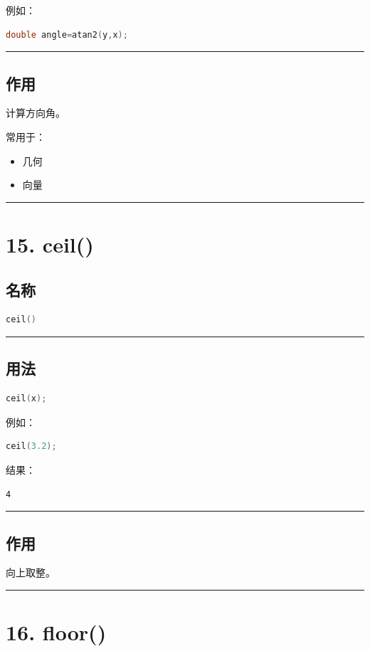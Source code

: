 \documentclass[9pt,twocolumn]{extarticle}
\begin{document}
例如：
\begin{lstlisting}[language=C++]
double angle=atan2(y,x);
\end{lstlisting}

\noindent\rule{\linewidth}{0.4pt}

\subsection{作用}
计算方向角。

常用于：
\begin{itemize}
    \item 几何
    \item 向量
\end{itemize}

\noindent\rule{\linewidth}{0.4pt}

\section{15. ceil()}

\subsection{名称}
\begin{lstlisting}[language=C++]
ceil()
\end{lstlisting}

\noindent\rule{\linewidth}{0.4pt}

\subsection{用法}
\begin{lstlisting}[language=C++]
ceil(x);
\end{lstlisting}
例如：
\begin{lstlisting}[language=C++]
ceil(3.2);
\end{lstlisting}
结果：
\begin{lstlisting}
4
\end{lstlisting}

\noindent\rule{\linewidth}{0.4pt}

\subsection{作用}
向上取整。

\noindent\rule{\linewidth}{0.4pt}

\section{16. floor()}
\end{document}
